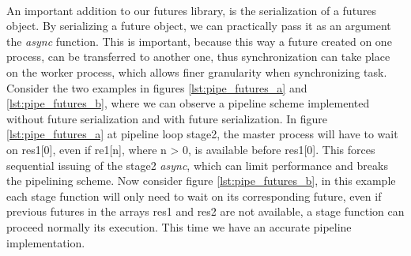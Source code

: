 \paragraph{}
An important addition to our futures library, is the serialization of a futures object.  By serializing a future
object, we can practically pass it as an argument the \emph{async} function.  This is important, because this way
a future created on one process, can be transferred to another one, thus synchronization can take place on the 
worker process, which allows finer granularity when synchronizing task.  Consider the two examples in figures 
\ref{lst:pipe_futures_a} and \ref{lst:pipe_futures_b}, where we can observe a pipeline scheme implemented 
without future serialization and with future serialization.  In figure \ref{lst:pipe_futures_a} at pipeline
loop stage2, the master process will have to wait on res1[0], even if re1[n], where n > 0, is available before
res1[0].  This forces sequential issuing of the stage2 \emph{async}, which can limit performance and breaks the 
pipelining scheme.  Now consider figure \ref{lst:pipe_futures_b}, in this example each stage function will only
need to wait on its corresponding future, even if previous futures in the arrays res1 and res2 are not available,
a stage function can proceed normally its execution.  This time we have an accurate pipeline implementation.

